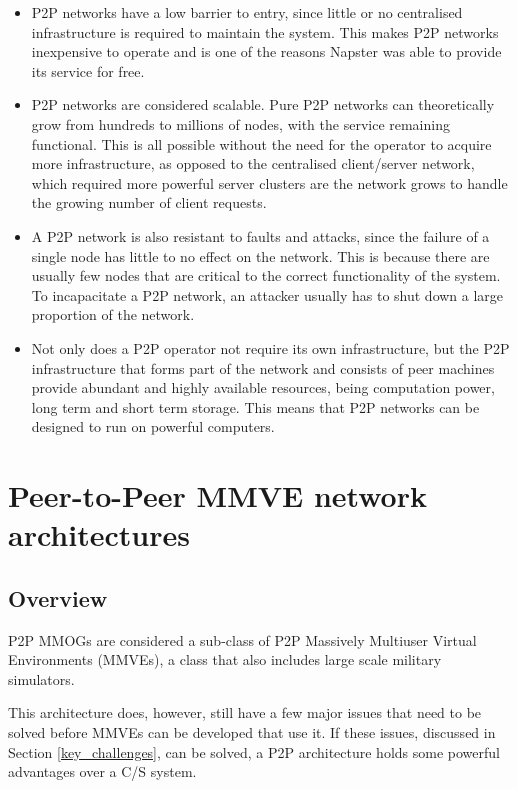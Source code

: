 \begin{itemize}
\item P2P networks have a low barrier to entry, since little or no centralised infrastructure is required to maintain the system. This makes P2P networks inexpensive to operate and is one of the reasons Napster was able to provide its service for free.

\item P2P networks are considered scalable. Pure P2P networks can theoretically grow from hundreds to millions of nodes, with the service remaining functional. This is all possible without the need for the operator to acquire more infrastructure, as opposed to the centralised client/server network, which required more powerful server clusters are the network grows to handle the growing number of client requests.

\item A P2P network is also resistant to faults and attacks, since the failure of a single node has little to no effect on the network. This is because there are usually few nodes that are critical to the correct functionality of the system. To incapacitate a P2P network, an attacker usually has to shut down a large proportion of the network.

\item Not only does a P2P operator not require its own infrastructure, but the P2P infrastructure that forms part of the network and consists of peer machines provide abundant and highly available resources, being computation power, long term and short term storage. This means that P2P networks can be designed to run on powerful computers.
\end{itemize}


\section{Peer-to-Peer MMVE network architectures}
\label{p2p_network_architectures}

\subsection{Overview}

P2P MMOGs are considered a sub-class of P2P Massively Multiuser Virtual Environments (MMVEs), a class that also includes large scale military simulators.

This architecture does, however, still have a few major issues that need to be solved before MMVEs can be developed that use it. If
these issues, discussed in Section \ref{key_challenges}, can be solved, a P2P architecture holds some powerful advantages over a C/S system.

